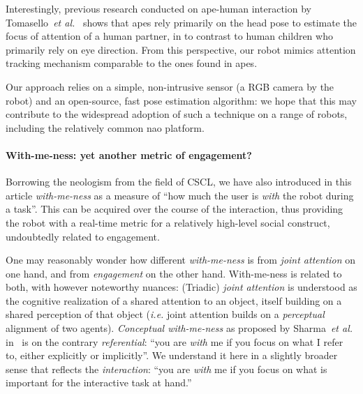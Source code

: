 \documentclass{sig-alternate}
\newcommand{\etal}{\textit{et al.}\xspace}
\newcommand{\ie}{\textit{i.e.}\xspace}
\begin{document}
Interestingly, previous research conducted on ape-human interaction by
Tomasello~\etal~\cite{tomasello2007reliance} shows that apes rely primarily on
the head pose to estimate the focus of attention of a human partner, in to
contrast to human children who primarily rely on eye direction. From this
perspective, our robot mimics attention tracking mechanism comparable to the
ones found in apes.

Our approach relies on a simple, non-intrusive sensor (a RGB camera by the
robot) and an open-source, fast pose estimation algorithm: we hope that this may contribute to the widespread
adoption of such a technique on a range of robots, including the relatively
common {\sc nao} platform.


\paragraph{With-me-ness: yet another metric of engagement?}

Borrowing the neologism from the field of CSCL, we have also introduced in this
article \emph{with-me-ness} as a measure of ``how much the user is \emph{with}
the robot during a task''. This can be acquired over the course of the
interaction, thus providing the robot with a real-time metric for a relatively
high-level social construct, undoubtedly related to engagement.

One may reasonably wonder how different \emph{with-me-ness} is from \emph{joint
attention} on one hand, and from \emph{engagement} on the other hand.
With-me-ness is related to both, with however noteworthy nuances: (Triadic)
\emph{joint attention} is understood as the cognitive realization of a shared
attention to an object, itself building on a shared perception of that object
(\ie joint attention builds on a \emph{perceptual} alignment of two agents).
\emph{Conceptual with-me-ness} as proposed by Sharma~\etal
in~\cite{sharma2014me} is on the contrary \emph{referential}: ``you are
\emph{with} me if you focus on what I refer to, either explicitly or
implicitly''. We understand it here in a slightly broader sense that reflects
the \emph{interaction}: ``you are \emph{with} me if you focus on what is
important for the interactive task at hand.''
\end{document}
